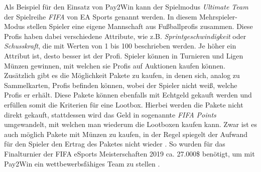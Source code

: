 Als Beispiel für den Einsatz von Pay2Win kann der Spielmodus \textit{Ultimate Team} der Spielreihe \textit{FIFA} von EA Sports genannt werden. In diesem Mehrspieler-Modus stellen Spieler eine eigene Mannschaft aus Fußballprofis zusammen. Diese Profis haben dabei verschiedene Attribute, wie z.B. \textit{Sprintgeschwindigkeit} oder \textit{Schusskraft}, die mit Werten von 1 bis 100 beschrieben werden. Je höher ein Attribut ist, desto besser ist der Profi. Spieler können in Turnieren und Ligen Münzen gewinnen, mit welchen sie Profis auf Auktionen kaufen können. Zusätzlich gibt es die Möglichkeit Pakete zu kaufen, in denen sich, analog zu Sammelkarten, Profis befinden können, wobei der Spieler nicht weiß, welche Profis er erhält. Diese Pakete können ebenfalls mit Echtgeld gekauft werden und erfüllen somit die Kriterien für eine Lootbox. Hierbei werden die Pakete nicht direkt gekauft, stattdessen wird das Geld in sogenannte \textit{FIFA Points} umgewandelt, mit welchen man wiederum die Lootboxen kaufen kann. Zwar ist es auch möglich Pakete mit Münzen zu kaufen, in der Regel spiegelt der Aufwand für den Spieler den Ertrag des Paketes nicht wieder \citep[S. 188]{Tregel2020}. So wurden für das Finalturnier der FIFA eSports Meisterschaften 2019 ca. 27.000\$ benötigt, um mit Pay2Win ein wettbewerbsfähiges Team zu stellen \citep{Akerman2019}.